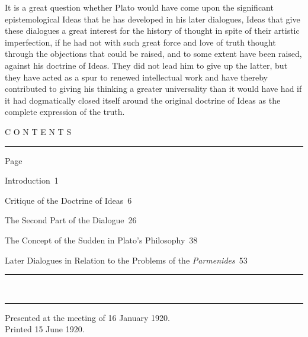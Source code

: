 \documentclass[12pt,a4paper,openany]{book}
\newcommand{\tocline}[3]{\noindent\makebox[2.2em][r]{#1}\hspace{0.6em}#2\dotfill\ #3\par}
\begin{document}
It is a great question whether Plato would have come upon
the significant epistemological Ideas
that he has developed in his later dialogues, Ideas that give
these dialogues a great interest for the history of thought
in spite of their artistic imperfection, if he had not
with such great force and love of truth thought through
the objections that could be raised, and to some extent have been
raised, against his doctrine of Ideas.  They did not lead him to give up
the latter, but they have acted as a spur to renewed intellectual work
and have thereby contributed to giving his thinking
a greater universality than it would have had if
it had dogmatically closed itself around the original doctrine of Ideas
as the complete expression of the truth.

\clearpage
\begin{center}{\large C O N T E N T S}\\[0.3em]\rule{3em}{0.4pt}\end{center}
\hfill{\small Page}\par
\tocline{}{Introduction}{1}
\tocline{1.}{Critique of the Doctrine of Ideas}{6}
\tocline{2.}{The Second Part of the Dialogue}{26}
\tocline{3.}{The Concept of the Sudden in Plato's Philosophy}{38}
\tocline{4.}{Later Dialogues in Relation to the Problems of the \textit{Parmenides}}{53}
\begin{center}\rule{3em}{0.4pt}\\[-0.8em]\rule{3em}{0.4pt}\end{center}
\vfill
\begin{center}{\small Presented at the meeting of 16 January 1920.\\ Printed 15 June 1920.}\end{center}
\end{document}
